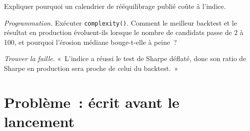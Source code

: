 \begin{exercise}[$\star\star$]\label{exo:s2:quantitative-investment-strategies:6}
Expliquer pourquoi un calendrier de rééquilibrage publié coûte à l'indice.
\end{exercise}

\begin{exercise}[$\star\star\star$]\label{exo:s2:quantitative-investment-strategies:7}
\emph{Programmation.} Exécuter \texttt{complexity()}. Comment le meilleur backtest et le résultat en production évoluent-ils lorsque le nombre de candidats passe de 2 à 100,
et pourquoi l'érosion médiane bouge-t-elle à peine~?
\end{exercise}

\begin{exercise}[$\star\star\star$]\label{exo:s2:quantitative-investment-strategies:8}
\emph{Trouver la faille.} «~L'indice a réussi le test de Sharpe déflaté, donc son ratio de Sharpe en production sera proche de celui du backtest.~»
\end{exercise}

\section{Problème~: écrit avant le lancement}

